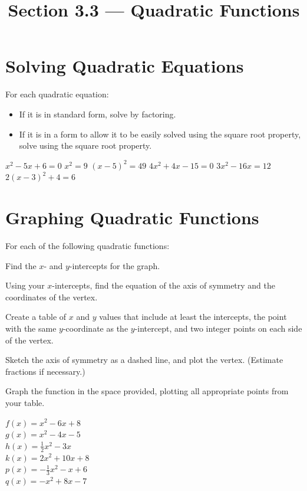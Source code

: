 

\title{Section 3.3 --- Quadratic Functions}


\maketitle
\section*{Solving Quadratic Equations}
For each quadratic equation:
\begin{itemize}
\item If it is in standard form, solve by factoring.
\item If it is in a form to allow it to be easily solved using the square root property, solve using the square root property.
\end{itemize}
\begin{smenum}
\mitemxxx
{$x^2-5x+6=0$}
{$x^2=9$}
{$(x-5)^2=49$}
\mitemxxx
{$4x^2+4x-15=0$}
{$3x^2-16x=12$}
{$2(x-3)^2+4=6$}
\end{smenum}
\section*{Graphing Quadratic Functions}
For each of the following quadratic functions:
\begin{clist}
\item Find the $x$- and $y$-intercepts for the graph.
\item Using your $x$-intercepts, find the equation of the axis of symmetry and the coordinates of the vertex.
\item Create a table of $x$ and $y$ values that include at least the intercepts, the point with the same $y$-coordinate as the $y$-intercept, and two integer points on each side of the vertex.
\item Sketch the axis of symmetry as a dashed line, and plot the vertex. (Estimate fractions if necessary.)
\item Graph the function in the space provided, plotting all appropriate points from your table.
\end{clist}
\begin{smenum}
\mitemxx
{$f(x)=x^2-6x+8$\\\GridSquareFitEO[10]}
{$g(x)=x^2-4x-5$\\\GridSquareFitEO[10]}
\clearpage
\mitemxx
{$h(x)=\frac{1}{2}x^2-3x$\\\GridSquareFitEO[10]}
{$k(x)=2x^2+10x+8$\\\GridSquareFitEO[10]}
\mitemxx
{$p(x)=-\frac{1}{3}x^2-x+6$\\\GridSquareFitEO[10]}
{$q(x)=-x^2+8x-7$\\\GridSquareFitEO[10]}
\end{smenum}


